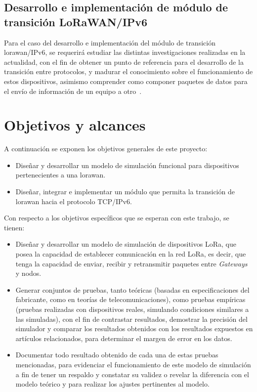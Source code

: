 \begin{justify}
\subsection{Desarrollo e implementación de módulo de transición LoRaWAN/IPv6} 
Para el caso del desarrollo e implementación del módulo de transición \gls{lorawan}/IPv6, se requerirá estudiar las distintas investigaciones realizadas en la actualidad, con el fin de obtener un punto de referencia para el desarrollo de la transición entre protocolos, y madurar el conocimiento sobre el funcionamiento de estos dispositivos, asimismo comprender como componer paquetes de datos para el envío de información de un equipo a otro~\cite{Juha}.

\section{Objetivos y alcances}
A continuación se exponen los objetivos generales de este proyecto:\\
\begin{itemize}
\item Diseñar y desarrollar un modelo de simulación funcional para dispositivos pertenecientes a una \gls{lorawan}.
\item Diseñar, integrar e implementar un módulo que permita la transición de \gls{lorawan} hacia el protocolo TCP/IPv6.
\end{itemize}
Con respecto a los objetivos específicos que se esperan con este trabajo, se tienen:\
\begin{itemize}
\item Diseñar y desarrollar un modelo de simulación de dispositivos LoRa, que posea la capacidad de establecer comunicación en la red LoRa, es decir, que tenga la capacidad de enviar, recibir y retransmitir paquetes entre \textit{Gateways} y nodos.
\item Generar conjuntos de pruebas, tanto teóricas (basadas en especificaciones del fabricante, como en teorías de telecomunicaciones), como pruebas empíricas (pruebas realizadas con dispositivos reales, simulando condiciones similares a las simuladas), con el fin de contrastar resultados, demostrar la precisión del simulador y comparar los resultados obtenidos con los resultados expuestos en artículos relacionados, para determinar el margen de error en los datos.
\item Documentar todo resultado obtenido de cada una de estas pruebas mencionadas, para evidenciar el funcionamiento de este modelo de simulación a fin de tener un respaldo y constatar su validez o revelar la diferencia con el modelo teórico y para realizar los ajustes pertinentes al modelo.

\end{itemize}
\end{justify}
